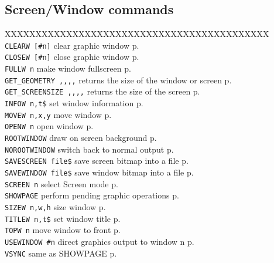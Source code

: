 \subsection{Screen/Window commands}
\begin{tabbing}
XXXXXXXXXXXXXXX\=XXXXXXXXXXXXXXXXXXXXXXXXXXXX\=\kill\\
\verb|CLEARW [#n]|  	\> clear graphic window\> p.\pageref{CLEARW}\\
\verb|CLOSEW [#n]|  	\> close graphic window\> p.\pageref{CLOSEW}\\
\verb|FULLW n| 		\>  make window fullscreen\> p.\pageref{FULLW}\\
\verb|GET_GEOMETRY ,,,,|  \> returns the size of the window or screen\> p.\pageref{GETiGEOMETRY}\\
\verb|GET_SCREENSIZE ,,,,|  \> returns the size of the screen\> p.\pageref{GETiSCREENSIZE}\\
\verb|INFOW n,t$|	\> set window information\> p.\pageref{INFOW}\\
\verb|MOVEW n,x,y|	\>  move window\> p.\pageref{MOVEW}\\
\verb|OPENW n| 		\>  open window\> p.\pageref{OPENW}\\
\verb|ROOTWINDOW|	\> draw on screen background\> p.\pageref{ROOTWINDOW}\\
\verb|NOROOTWINDOW|	\> switch back to normal output\> p.\pageref{NOROOTWINDOW}\\
\verb|SAVESCREEN file$|	\> save screen bitmap into a file\> p.\pageref{SAVESCREEN}\\
\verb|SAVEWINDOW file$|	\> save window bitmap into a file\> p.\pageref{SAVEWINDOW}\\
\verb|SCREEN n|		\> select Screen mode \> p.\pageref{SCREEN}\\
\verb|SHOWPAGE|		\> perform pending graphic operations\> p.\pageref{SHOWPAGE}\\
\verb|SIZEW n,w,h|	\> size window\> p.\pageref{SIZEW}\\
\verb|TITLEW n,t$|	\> set window title\> p.\pageref{TITLEW}\\
\verb|TOPW n| 		\>  move window to front\> p.\pageref{TOPW}\\
\verb|USEWINDOW #n|	\> direct graphics output to window n\> p.\pageref{USEWINDOW}\\
\verb|VSYNC|		\> same as SHOWPAGE\> p.\pageref{VSYNC}\\

 \end{tabbing}
 
